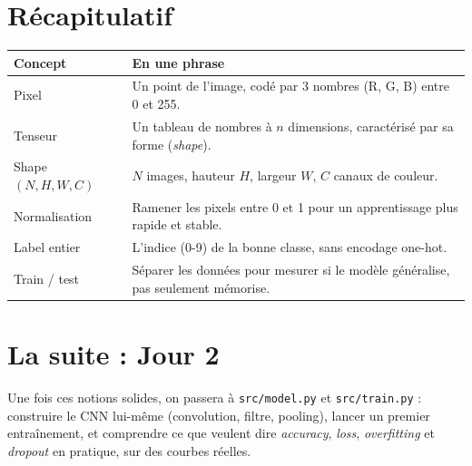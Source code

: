 \documentclass[11pt,a4paper]{article}
\begin{document}
\section{R\'ecapitulatif}

\begin{center}
\begin{tabular}{@{}p{4cm}p{10cm}@{}}
\toprule
Concept & En une phrase \\
\midrule
Pixel & Un point de l'image, cod\'e par 3 nombres (R, G, B) entre 0 et 255. \\
Tenseur & Un tableau de nombres \`a $n$ dimensions, caract\'eris\'e par sa forme (\emph{shape}). \\
Shape $(N,H,W,C)$ & $N$ images, hauteur $H$, largeur $W$, $C$ canaux de couleur. \\
Normalisation & Ramener les pixels entre 0 et 1 pour un apprentissage plus rapide et stable. \\
Label entier & L'indice (0-9) de la bonne classe, sans encodage one-hot. \\
Train / test & S\'eparer les donn\'ees pour mesurer si le mod\`ele g\'en\'eralise, pas seulement m\'emorise. \\
\bottomrule
\end{tabular}
\end{center}

\section{La suite : Jour 2}

Une fois ces notions solides, on passera \`a \texttt{src/model.py} et
\texttt{src/train.py} : construire le CNN lui-m\^eme (convolution,
filtre, pooling), lancer un premier entra\^inement, et comprendre ce que
veulent dire \emph{accuracy}, \emph{loss}, \emph{overfitting} et
\emph{dropout} en pratique, sur des courbes r\'eelles.
\end{document}
